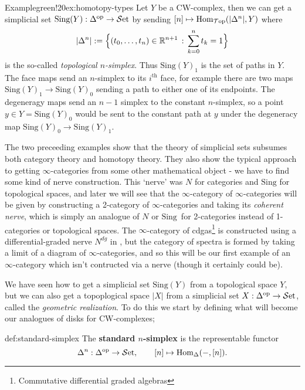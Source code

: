 \begin{env}{Example}{green!20}{ex:homotopy-types}
	Let $Y$ be a CW-complex, then we can get a simplicial set $\text{Sing}(Y) : \Delta^\text{op} \to {\mathcal{S}\text{et}}$ by sending $[n] \mapsto {\text{Hom}}_{\mathcal{T}\text{op}}(|\Delta^n|,Y)$ where
	\[
		|\Delta^n|
		:= \Big\{
			(t_0,\dots,t_n) \in \mathbb{R}^{n+1}
			\,:\,
			\sum_{k=0}^n t_k = 1
		\Big\}
	\]
	is the so-called \textit{topological $n$-simplex}. Thus $\text{Sing}(Y)_1$ is the set of paths in $Y$. The face maps send an $n$-simplex to its $i^\text{th}$ face, for example there are two maps $\text{Sing}(Y)_1 \to \text{Sing}(Y)_0$ sending a path to either one of its endpoints. The degeneragy maps send an $n-1$ simplex to the constant $n$-simplex, so a point $y \in Y = \text{Sing}(Y)_0$ would be sent to the constant path at $y$ under the degeneracy map $\text{Sing}(Y)_0 \to \text{Sing}(Y)_1$. 
\end{env}

The two preceeding examples show that the theory of simplicial sets subsumes both category theory and homotopy theory. They also show the typical approach to getting $\infty$-categories from some other mathematical object - we have to find some kind of nerve construction. This `nerve' was $N$ for categories and $\text{Sing}$ for topological spaces, and later we will see that the $\infty$-category of $\infty$-categories will be given by constructing a 2-category of $\infty$-categories and taking its \textit{coherent nerve}, which is simply an analogue of $N$ or $\text{Sing}$ for 2-categories instead of 1-categories or topological spaces. The $\infty$-category of cdgas\footnote{Commutative differential graded algebras} is constructed using a differential-graded nerve $N^{dg}$ in \cite{HA}, but the category of spectra is formed by taking a limit of a diagram of $\infty$-categories, and so this will be our first example of an $\infty$-category which isn't contructed via a nerve (though it certainly could be).

We have seen how to get a simplicial set $\text{Sing}(Y)$ from a topological space $Y$, but we can also get a topoplogical space $|X|$ from a simplicial set $X : \Delta^\text{op} \to {\mathcal{S}\text{et}}$, called the \textit{geometric realization}. To do this we start by defining what will become our analogues of disks for CW-complexes;

\begin{definition}{def:standard-simplex}
	The \textbf{standard $n$-simplex} is the representable functor
		\[
		\Delta^n : \Delta^\text{op} \to {\mathcal{S}\text{et}},
		\qquad 
		[n] \mapsto {\text{Hom}}_\Delta(-,[n]).
		\]
\end{definition}

